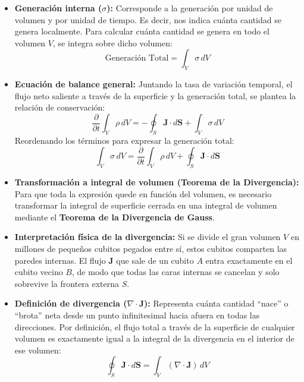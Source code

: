 \documentclass[11pt,letterpaper]{article}
\begin{document}
\begin{itemize}
    \item \textbf{Generación interna ($\sigma$):} Corresponde a la generación por unidad de volumen y por unidad de tiempo. Es decir, nos indica cuánta cantidad se genera localmente. Para calcular cuánta cantidad se genera en todo el volumen $V$, se integra sobre dicho volumen:
    \begin{equation}
        \text{Generación Total} = \int_V \sigma \, dV
    \end{equation}
    
    \item \textbf{Ecuación de balance general:} Juntando la tasa de variación temporal, el flujo neto saliente a través de la superficie y la generación total, se plantea la relación de conservación:
    \begin{equation}
        \frac{\partial}{\partial t} \int_V \rho \, dV = -\oint_S \mathbf{J} \cdot d\mathbf{S} + \int_V \sigma \, dV
    \end{equation}
    Reordenando los términos para expresar la generación total:
    \begin{equation}
        \int_V \sigma \, dV = \frac{\partial}{\partial t} \int_V \rho \, dV + \oint_S \mathbf{J} \cdot d\mathbf{S}
    \end{equation}

    \item \textbf{Transformación a integral de volumen (Teorema de la Divergencia):} Para que toda la expresión quede en función del volumen, es necesario transformar la integral de superficie cerrada en una integral de volumen mediante el \textbf{Teorema de la Divergencia de Gauss}.
    
    \item \textbf{Interpretación física de la divergencia:} Si se divide el gran volumen $V$ en millones de pequeños cubitos pegados entre sí, estos cubitos comparten las paredes internas. El flujo $\mathbf{J}$ que sale de un cubito $A$ entra exactamente en el cubito vecino $B$, de modo que todas las caras internas se cancelan y solo sobrevive la frontera externa $S$. 
    
    \item \textbf{Definición de divergencia ($\nabla \cdot \mathbf{J}$):} Representa cuánta cantidad ``nace'' o ``brota'' neta desde un punto infinitesimal hacia afuera en todas las direcciones. Por definición, el flujo total a través de la superficie de cualquier volumen es exactamente igual a la integral de la divergencia en el interior de ese volumen:
    \begin{equation}
        \oint_S \mathbf{J} \cdot d\mathbf{S} = \int_V (\nabla \cdot \mathbf{J}) \, dV
    \end{equation}


\end{itemize}
\end{document}
